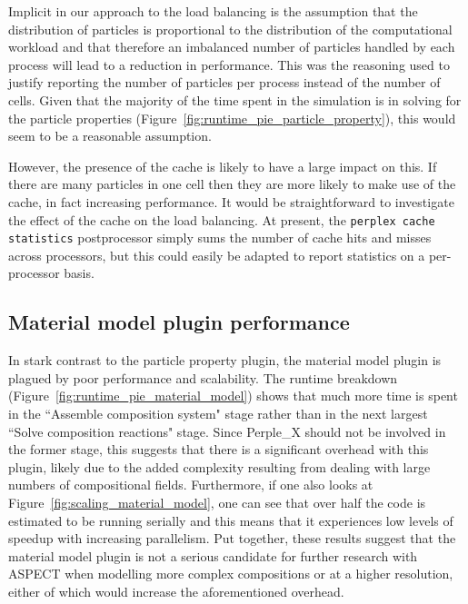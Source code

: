 Implicit in our approach to the load balancing is the assumption that the distribution of particles is proportional to the distribution of the computational workload and that therefore an imbalanced number of particles handled by each process will lead to a reduction in performance.
This was the reasoning used to justify reporting the number of particles per process instead of the number of cells.
Given that the majority of the time spent in the simulation is in solving for the particle properties (Figure~\ref{fig:runtime_pie_particle_property}), this would seem to be a reasonable assumption.

However, the presence of the cache is likely to have a large impact on this.
If there are many particles in one cell then they are more likely to make use of the cache, in fact increasing performance.
It would be straightforward to investigate the effect of the cache on the load balancing.
At present, the \texttt{perplex cache statistics} postprocessor simply sums the number of cache hits and misses across processors, but this could easily be adapted to report statistics on a per-processor basis.

\subsection{Material model plugin performance}

In stark contrast to the particle property plugin, the material model plugin is plagued by poor performance and scalability.
The runtime breakdown (Figure~\ref{fig:runtime_pie_material_model}) shows that much more time is spent in the ``Assemble composition system" stage rather than in the next largest ``Solve composition reactions" stage.
Since Perple\_X should not be involved in the former stage, this suggests that there is a significant overhead with this plugin, likely due to the added complexity resulting from dealing with large numbers of compositional fields.
Furthermore, if one also looks at Figure~\ref{fig:scaling_material_model}, one can see that over half the code is estimated to be running serially and this means that it experiences low levels of speedup with increasing parallelism.
Put together, these results suggest that the material model plugin is not a serious candidate for further research with ASPECT when modelling more complex compositions or at a higher resolution, either of which would increase the aforementioned overhead.

